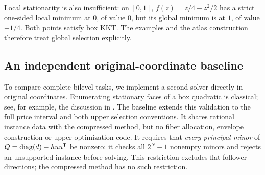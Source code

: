 Local stationarity is also insufficient: on $[0,1]$,
$f(z)=z/4-z^2/2$ has a strict one-sided local minimum at $0$, of value $0$,
but its global minimum is at $1$, of value $-1/4$. Both points satisfy box KKT.
The examples and the atlas construction therefore treat global selection
explicitly.

\subsection{An independent original-coordinate baseline}
\label{subsec:full-task-baseline}
To compare complete bilevel tasks, we implement a second solver directly in
original coordinates. Enumerating stationary faces of a box quadratic is
classical; see, for example, the discussion in \cite{HladikCernyRada2021}.
The baseline extends this validation to the full price interval and both upper
selection conventions. It shares rational instance data with the compressed
method, but no fiber allocation, envelope construction or upper-optimization
code. It requires that \emph{every principal minor} of
$Q=\operatorname{diag}(d)-huu^{\mathsf T}$ be nonzero: it checks all $2^N-1$ nonempty minors
and rejects an unsupported instance before solving. This restriction excludes
flat follower directions; the compressed method has no such restriction.

